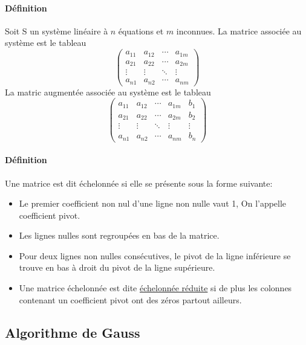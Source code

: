 \paragraph{Définition} Soit S un système linéaire à $n$ équations et $m$ inconnues. La matrice associée au système est le tableau
$$\begin{pmatrix}
  a_{11} & a_{12} & \cdots & a_{1m} \\
  a_{21} & a_{22} & \cdots & a_{2m} \\
  \vdots  & \vdots  & \ddots & \vdots  \\
  a_{n1} & a_{n2} & \cdots & a_{nm}
 \end{pmatrix}$$
La matric augmentée associée au système est le tableau
$$\begin{pmatrix}
  a_{11} & a_{12} & \cdots & a_{1m} & b_{1} \\
  a_{21} & a_{22} & \cdots & a_{2m} & b_{2} \\
  \vdots  & \vdots  & \ddots & \vdots & \vdots  \\
  a_{n1} & a_{n2} & \cdots & a_{nm} & b_{n}
 \end{pmatrix}$$
 
\paragraph{Définition} Une matrice est dit échelonnée si elle se présente sous la forme suivante:
\begin{itemize}
  \item Le premier coefficient non nul d'une ligne non nulle vaut 1, On l'appelle coefficient pivot.
  \item Les lignes nulles sont regroupées en bas de la matrice.
  \item Pour deux lignes non nulles consécutives, le pivot de la ligne inférieure se trouve en bas à droit du pivot de la ligne supérieure.
  \item Une matrice échelonnée est dite \underline{échelonnée réduite} si de plus les colonnes contenant un coefficient pivot ont des zéros partout ailleurs.
\end{itemize}

%
\subsection{Algorithme de Gauss}
%
